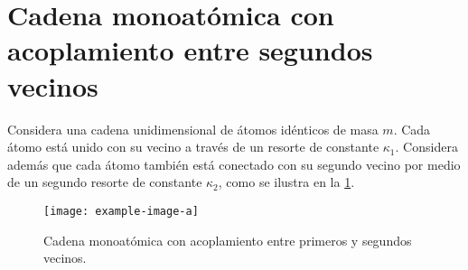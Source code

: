 \documentclass[./../main.tex]{subfiles}
\begin{document}
    \section{Cadena monoatómica con acoplamiento entre segundos vecinos}

    Considera una cadena unidimensional de átomos idénticos de masa \(m\). Cada átomo está unido con su vecino a través de un resorte de constante \(\kappa_{1}\). Considera además que cada átomo también está conectado con su segundo vecino por medio de un segundo resorte de constante \(\kappa_{2}\), como se ilustra en la \cref{fig:monatomicChain}.

        \begin{figure}[htb]
            \centering
            \texttt{[image: example-image-a]}
            \caption{Cadena monoatómica con acoplamiento entre primeros y segundos vecinos.}
            \label{fig:monatomicChain}
        \end{figure}
\end{document}
